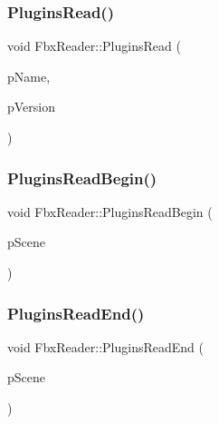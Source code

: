 \mbox{\label{class_fbx_reader_a72e6537a9823550e485243aa67a48bbd}} 
\subsubsection{\texorpdfstring{Plugins\+Read()}{PluginsRead()}}
{\footnotesize\ttfamily void Fbx\+Reader\+::\+Plugins\+Read (\begin{DoxyParamCaption}\item[{const char $\ast$}]{p\+Name,  }\item[{const char $\ast$}]{p\+Version }\end{DoxyParamCaption})\hspace{0.3cm}{\ttfamily [protected]}}

\mbox{\label{class_fbx_reader_a55e4e6db14fdee2454bb590551310b03}} 
\subsubsection{\texorpdfstring{Plugins\+Read\+Begin()}{PluginsReadBegin()}}
{\footnotesize\ttfamily void Fbx\+Reader\+::\+Plugins\+Read\+Begin (\begin{DoxyParamCaption}\item[{\hyperlink{class_fbx_scene}{Fbx\+Scene} \&}]{p\+Scene }\end{DoxyParamCaption})\hspace{0.3cm}{\ttfamily [protected]}}

\mbox{\label{class_fbx_reader_ab0213250ebf3b09c6f31ee1d2a610a07}} 
\subsubsection{\texorpdfstring{Plugins\+Read\+End()}{PluginsReadEnd()}}
{\footnotesize\ttfamily void Fbx\+Reader\+::\+Plugins\+Read\+End (\begin{DoxyParamCaption}\item[{\hyperlink{class_fbx_scene}{Fbx\+Scene} \&}]{p\+Scene }\end{DoxyParamCaption})\hspace{0.3cm}{\ttfamily [protected]}}

